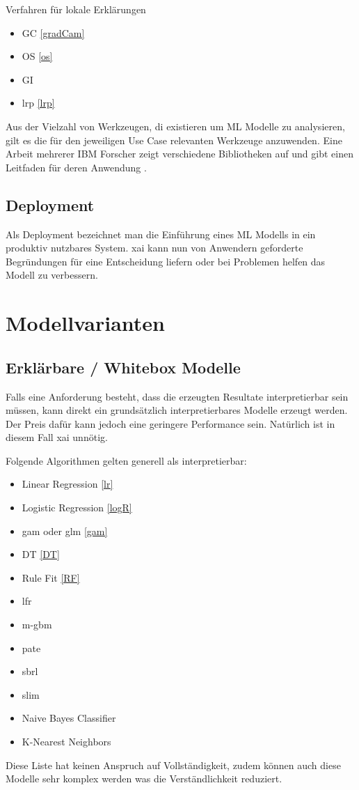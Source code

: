 \documentclass[
  12pt, %
  a4paper, %
  oneside, %
  openany, 
  numbers=noenddot, %
  BCOR=5mm, %
  parskip=half*, %
  thesis, %
]{bfhbook}
\begin{document}
Verfahren für lokale Erklärungen
\begin{itemize}
	\item \Gls{GC} \ref{gradCam}
	\item \Gls{OS} \ref{os}
	\item \Gls{GI}
	\item \Gls{lrp}  \ref{lrp}
\end{itemize}

Aus der Vielzahl von Werkzeugen, di existieren um \Gls{ML} Modelle zu analysieren, gilt es die für den jeweiligen Use Case relevanten Werkzeuge anzuwenden. Eine Arbeit mehrerer IBM Forscher zeigt verschiedene Bibliotheken auf und gibt einen Leitfaden für deren Anwendung \parencite{Arya2019}.  

\section{Deployment}
Als Deployment bezeichnet man die Einführung eines \Gls{ML} Modells in ein produktiv nutzbares System. \Gls{xai} kann nun von Anwendern geforderte Begründungen für eine Entscheidung liefern oder bei Problemen helfen das Modell zu verbessern.

\chapter{Modellvarianten}
\section{Erklärbare / Whitebox Modelle}

Falls eine Anforderung besteht, dass die erzeugten Resultate interpretierbar sein müssen, kann direkt ein grundsätzlich interpretierbares Modelle erzeugt werden. Der Preis dafür kann jedoch eine geringere Performance sein. Natürlich ist in diesem Fall \Gls{xai} unnötig.


Folgende Algorithmen gelten generell als interpretierbar:
\begin{itemize}
	\item Linear Regression \ref{lr}
	\item Logistic Regression \ref{logR}
	\item \acrfull{gam} oder \acrfull{glm} \ref{gam}
	\item \Gls{DT} \ref{DT}
	\item Rule Fit  \ref{RF}
	\item \acrfull{lfr}
	\item \acrfull{m-gbm}
	\item \acrfull{pate}	
	\item \acrfull{sbrl}
	\item \acrfull{slim}
	\item Naive Bayes Classifier
	\item K-Nearest Neighbors
\end{itemize}
Diese Liste hat keinen Anspruch auf Vollständigkeit, zudem können auch diese Modelle sehr komplex werden was die Verständlichkeit reduziert.
\end{document}

